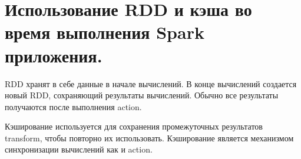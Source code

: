 \section{Использование RDD и кэша во время выполнения Spark приложения.}

RDD хранят в себе данные в начале вычислений. В конце вычислений
создается новый RDD, сохраняющий результаты вычислений.
Обычно все результаты получаются после выполнения action.

Кэширование используется для сохранения промежуточных результатов
transform, чтобы повторно их использовать. Кэширование является
механизмом синхронизации вычислений как и action.
